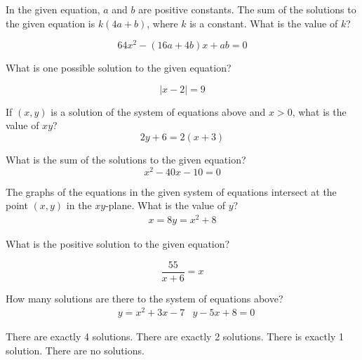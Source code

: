 \question[1]
In the given equation, $a$ and $b$ are positive constants. The sum of the solutions to the given equation is $k(4 a+b)$, where $k$ is a constant. What is the value of $k$?

\[
64 x^{2}-(16 a+4 b) x+a b=0
\]

\begin{solutionorbox}[1in]
\end{solutionorbox}

\question[1]
What is one possible solution to the given equation?

\[
|x-2|=9
\]

\begin{solutionorbox}[1in]
\end{solutionorbox}

\question[1]
If $(x, y)$ is a solution of the system of equations above and $x>0$, what is the value of $x y$?
\[
2 y+6=2(x+3)
\]
\begin{choices}
\end{choices}

\question[1]
What is the sum of the solutions to the given equation?
\[
x^{2}-40 x-10=0
\]
\begin{choices}
\end{choices}

\question[1]
The graphs of the equations in the given system of equations intersect at the point $(x, y)$ in the $x y$-plane. What is the value of $y$?
\[
\begin{gathered}
x=8 
y=x^{2}+8
\end{gathered}
\]
\begin{choices}
\end{choices}

\newpage

\question[1]
What is the positive solution to the given equation?

\[
\frac{55}{x+6}=x
\]

\begin{solutionorbox}[1in]
\end{solutionorbox}

\question[1]
How many solutions are there to the system of equations above?
\[
\begin{aligned}
& y=x^{2}+3 x-7 
& y-5 x+8=0
\end{aligned}
\]
\begin{choices}
  \choice There are exactly 4 solutions.
  \choice There are exactly 2 solutions.
  \CorrectChoice There is exactly 1 solution.
  \choice There are no solutions.
\end{choices}

